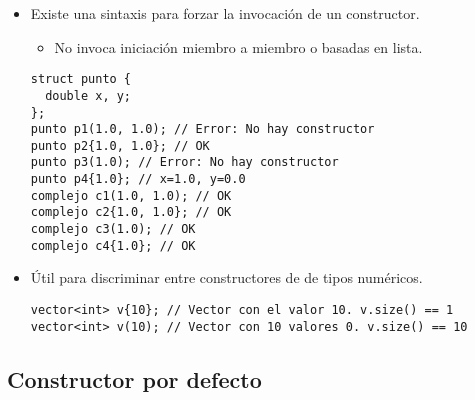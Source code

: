 \begin{frame}[fragile]
\begin{itemize}
  \item Existe una sintaxis para forzar la invocación de un constructor.
    \begin{itemize}
      \item No invoca iniciación miembro a miembro o basadas en lista.
    \end{itemize}
\begin{lstlisting}
struct punto {
  double x, y;
};
punto p1(1.0, 1.0); // Error: No hay constructor
punto p2{1.0, 1.0}; // OK
punto p3(1.0); // Error: No hay constructor
punto p4{1.0}; // x=1.0, y=0.0
complejo c1(1.0, 1.0); // OK
complejo c2{1.0, 1.0}; // OK
complejo c3(1.0); // OK
complejo c4{1.0}; // OK
\end{lstlisting}
  \item Útil para discriminar entre constructores de  de tipos numéricos.
\begin{lstlisting}
vector<int> v{10}; // Vector con el valor 10. v.size() == 1
vector<int> v(10); // Vector con 10 valores 0. v.size() == 10
\end{lstlisting}
\end{itemize}
\end{frame}

\subsection{Constructor por defecto}

